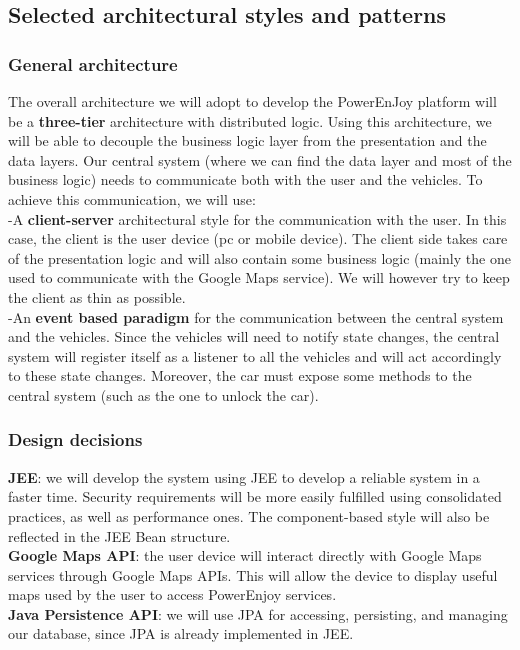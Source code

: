 \documentclass{article}
\begin{document}
\subsection{Selected architectural styles and patterns}
\subsubsection{General architecture}
The overall architecture we will adopt to develop the PowerEnJoy platform will be a \textbf{three-tier} architecture with distributed logic. Using this architecture, we will be able to decouple the business logic layer from the presentation and the data layers. Our central system (where we can find the data layer and most of the business logic) needs to communicate both with the user and the vehicles. To achieve this communication, we will use:\\
-A \textbf{client-server} architectural style for the communication with the user. In this case, the client is the user device (pc or mobile device). The client side takes care of the presentation logic and will also contain some business logic (mainly the one used to communicate with the Google Maps service). We will however try to keep the client as thin as possible.\\
-An \textbf{event based paradigm} for the communication between the central system and the vehicles. Since the vehicles will need to notify state changes, the central system will register itself as a listener to all the vehicles and will act accordingly to these state changes. Moreover, the car must expose some methods to the central system (such as the one to unlock the car).\\
\subsubsection{Design decisions}
\textbf{JEE}: we will develop the system using JEE to develop a reliable system in a faster time. Security requirements will be more easily fulfilled using consolidated practices, as well as performance ones. The component-based style will also be reflected in the JEE Bean structure.\\
\textbf{Google Maps API}: the user device will interact directly with Google Maps services through Google Maps APIs. This will allow the device to display useful maps used by the user to access PowerEnjoy services.\\
\textbf{Java Persistence API}: we will use JPA for accessing, persisting, and managing our database, since JPA is already implemented in JEE.\\
\end{document}
